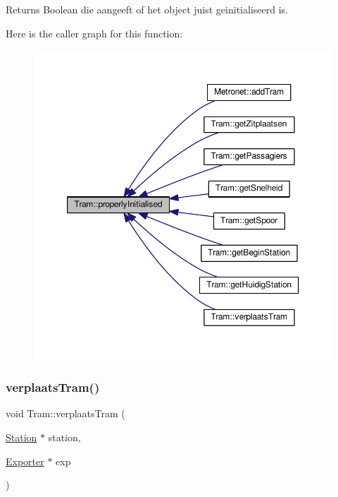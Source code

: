 \begin{DoxyReturn}{Returns}
Boolean die aangeeft of het object juist geinitialiseerd is. 
\end{DoxyReturn}
Here is the caller graph for this function\+:
\nopagebreak
\begin{figure}[H]
\begin{center}
\leavevmode
\includegraphics[width=350pt]{class_tram_ac2688f590e4db232b4f535c9bf959efb_icgraph}
\end{center}
\end{figure}
\mbox{\label{class_tram_ab2a78d1ff86257b8dd27a3b0abc440ee}} 
\subsubsection{\texorpdfstring{verplaats\+Tram()}{verplaatsTram()}}
{\footnotesize\ttfamily void Tram\+::verplaats\+Tram (\begin{DoxyParamCaption}\item[{\hyperlink{class_station}{Station} $\ast$}]{station,  }\item[{\hyperlink{class_exporter}{Exporter} $\ast$}]{exp }\end{DoxyParamCaption})}



